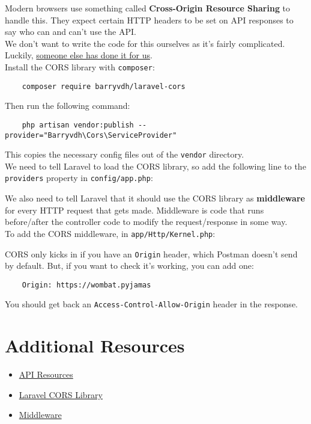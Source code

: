 Modern browsers use something called \textbf{Cross-Origin Resource Sharing} to handle this. They expect certain HTTP headers to be set on API responses to say who can and can't use the API.
\\

We don't want to write the code for this ourselves as it's fairly complicated. Luckily, \href{https://github.com/barryvdh/laravel-cors}{someone else has done it for us}.
\\

Install the CORS library with \texttt{composer}:

\begin{verbatim}
    composer require barryvdh/laravel-cors
\end{verbatim}

Then run the following command:

\begin{verbatim}
    php artisan vendor:publish --provider="Barryvdh\Cors\ServiceProvider"
\end{verbatim}

This copies the necessary config files out of the \texttt{vendor} directory.
\\

We need to tell Laravel to load the CORS library, so add the following line to the \texttt{providers} property in \texttt{config/app.php}:


We also need to tell Laravel that it should use the CORS library as \textbf{middleware} for every HTTP request that gets made. Middleware is code that runs before/after the controller code to modify the request/response in some way.
\\

To add the CORS middleware, in \texttt{app/Http/Kernel.php}:


CORS only kicks in if you have an \texttt{Origin} header, which Postman doesn't send by default. But, if you want to check it's working, you can add one:

\begin{verbatim}
    Origin: https://wombat.pyjamas
\end{verbatim}

You should get back an \texttt{Access-Control-Allow-Origin} header in the response.



\section{Additional Resources}

\begin{itemize}[leftmargin=*]
    \item \href{https://laravel.com/docs/master/eloquent-resources}{API Resources}
    \item \href{https://github.com/barryvdh/laravel-cors}{Laravel CORS Library}
    \item \href{http://laravel.com/docs/master/middleware}{Middleware}
\end{itemize}
